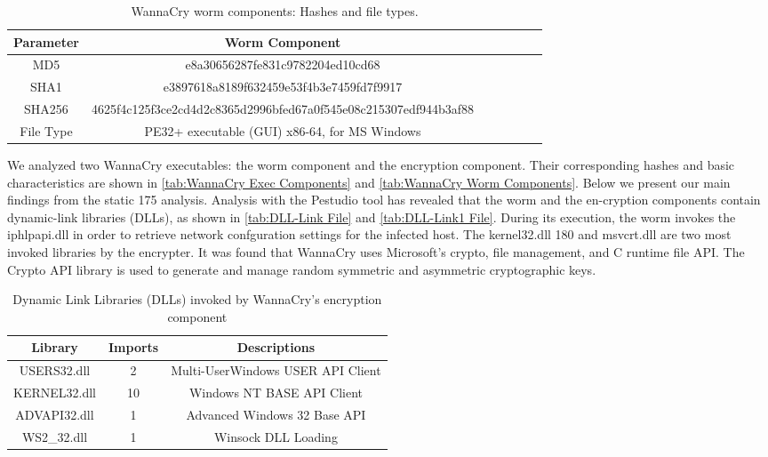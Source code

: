 \documentclass[12pt,letterpaper]{article}
\begin{document}
            \begin{table}[htbp]
                \centering
                \caption{WannaCry worm components: Hashes and file types.}
                \label{tab:WannaCry Worm Components}
                \begin{tabular}{ccccccc}
                    \toprule
                    \textbf{Parameter} & \textbf{Worm Component} \\
                    \midrule
                    MD5 & e8a30656287fe831c9782204ed10cd68 \\
                    SHA1 & e3897618a8189f632459e53f4b3e7459fd7f9917 \\
                    SHA256 & 4625f4c125f3ce2cd4d2c8365d2996bfed67a0f545e08c215307edf944b3af88 \\
                    File Type & PE32+ executable (GUI) x86-64, for MS Windows \\
                    \bottomrule
                \end{tabular}
            \end{table}

        We analyzed two WannaCry executables: the worm component and the
        encryption component. Their corresponding hashes and basic characteristics are shown in \autoref{tab:WannaCry Exec Components} and \autoref{tab:WannaCry Worm Components}. Below we present our main findings from the static 175 analysis.
        Analysis with the Pestudio tool has revealed that the worm and the en-cryption components contain dynamic-link libraries (DLLs), as shown in \autoref{tab:DLL-Link File} and \autoref{tab:DLL-Link1 File}. During its execution, the worm invokes the iphlpapi.dll in order to retrieve network confguration settings for the infected host. The kernel32.dll 180 and msvcrt.dll are two most invoked libraries by the encrypter. It was found that WannaCry uses Microsoft's crypto, file management, and C runtime file \ac{API}. The Crypto API library is used to generate and manage random symmetric and asymmetric cryptographic keys.


        \begin{table}[ht]
            \centering
            \caption{Dynamic Link Libraries (DLLs) invoked by WannaCry's encryption component}
            \label{tab:DLL-Link File}
            \begin{tabular}{ccc}
                \toprule
                \textbf{Library} & \textbf{Imports} & \textbf{Descriptions} \\
                \midrule
                USERS32.dll & 2& Multi-UserWindows USER API Client\\
                KERNEL32.dll & 10& Windows NT BASE API Client\\
                ADVAPI32.dll & 1& Advanced Windows 32 Base API\\
                WS2\_32.dll & 1& Winsock DLL Loading\\
                \bottomrule
            \end{tabular}
        \end{table}
\end{document}
